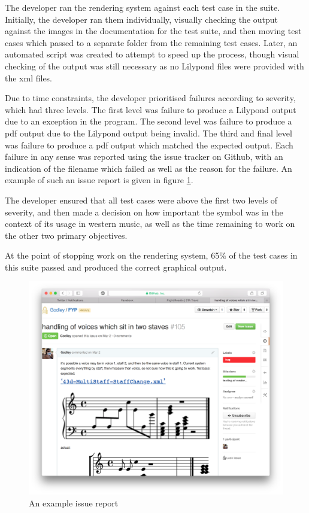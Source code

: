 The developer ran the rendering system against each test case in the suite. Initially, the developer ran them individually, visually checking the output against the images in the documentation for the test suite, and then moving test cases which passed to a separate folder from the remaining test cases. Later, an automated script was created to attempt to speed up the process, though visual checking of the output was still necessary as no Lilypond files were provided with the xml files.


Due to time constraints, the developer prioritised failures according to severity, which had three levels. The first level was failure to produce a Lilypond output due to an exception in the program. The second level was failure to produce a pdf output due to the Lilypond output being invalid. The third and final level was failure to produce a pdf output which matched the expected output. Each failure in any sense was reported using the issue tracker on Github, with an indication of the filename which failed as well as the reason for the failure. An example of such an issue report is given in figure \ref{fig:issue}.

The developer ensured that all test cases were above the first two levels of severity, and then made a decision on how important the symbol was in the context of its usage in western music, as well as the time remaining to work on the other two primary objectives.

At the point of stopping work on the rendering system, 65$\%$ of the test cases in this suite passed and produced the correct graphical output. 
\begin{figure}[H]
	\centering
	\includegraphics[width=400pt]{issue_report}	
	\caption{An example issue report}
	\label{fig:issue}
\end{figure}

